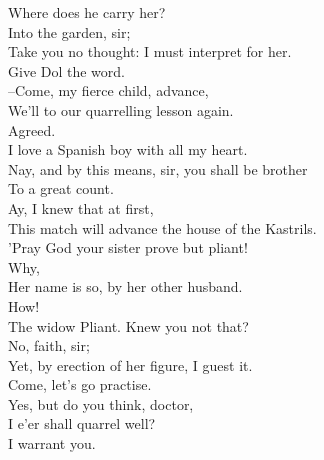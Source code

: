 \documentclass{memoir}
\begin{document}
\begin{drama*}
\kastrilspeaks  Where does he carry her?\\
\facespeaks {} Into the garden, sir;\\
 Take you no thought: I must interpret for her.\\
\subtlespeaks  Give Dol the word.\\
 --Come, my fierce child, advance,\\
 We'll to our quarrelling lesson again.\\
\kastrilspeaks  Agreed.\\
 I love a Spanish boy with all my heart.\\
\subtlespeaks  Nay, and by this means, sir, you shall be brother\\
 To a great count.\\
\kastrilspeaks {} Ay, I knew that at first,\\
 This match will advance the house of the Kastrils.\\
\subtlespeaks  'Pray God your sister prove but pliant!\\
\kastrilspeaks {} Why,\\
 Her name is so, by her other husband.\\
\subtlespeaks  How!\\
\kastrilspeaks {} The widow Pliant. Knew you not that?\\
\subtlespeaks  No, faith, sir;\\
 Yet, by erection of her figure, I guest it.\\
 Come, let's go practise.\\
\kastrilspeaks {} Yes, but do you think, doctor,\\
 I e'er shall quarrel well?\\
\subtlespeaks {} I warrant you.\\
\scene


\end{drama*}
\end{document}
